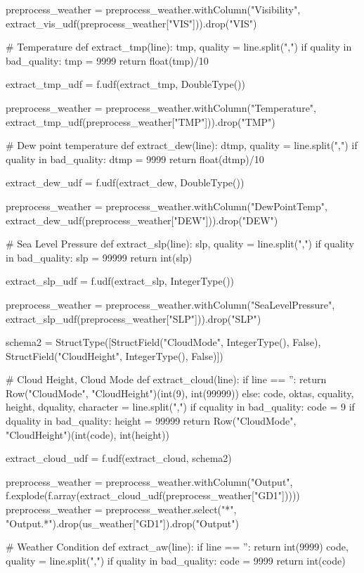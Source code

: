 \documentclass[11pt]{article}
\begin{document}
preprocess_weather = preprocess_weather.withColumn("Visibility", extract_vis_udf(preprocess_weather["VIS"])).drop("VIS")

# Temperature
def extract_tmp(line):
  tmp, quality = line.split(",")
  if quality in bad_quality:
      tmp = 9999
  return float(tmp)/10

extract_tmp_udf = f.udf(extract_tmp, DoubleType())

preprocess_weather = preprocess_weather.withColumn("Temperature", extract_tmp_udf(preprocess_weather["TMP"])).drop("TMP")

# Dew point temperature
def extract_dew(line):
  dtmp, quality = line.split(",")
  if quality in bad_quality:
      dtmp = 9999
  return float(dtmp)/10

extract_dew_udf = f.udf(extract_dew, DoubleType())

preprocess_weather = preprocess_weather.withColumn("DewPointTemp", extract_dew_udf(preprocess_weather["DEW"])).drop("DEW")

# Sea Level Pressure
def extract_slp(line):
  slp, quality = line.split(",")
  if quality in bad_quality:
      slp = 99999
  return int(slp)

extract_slp_udf = f.udf(extract_slp, IntegerType())

preprocess_weather = preprocess_weather.withColumn("SeaLevelPressure", extract_slp_udf(preprocess_weather["SLP"])).drop("SLP")

schema2 = StructType([StructField("CloudMode", IntegerType(), False), StructField("CloudHeight", IntegerType(), False)])

# Cloud Height, Cloud Mode
def extract_cloud(line):
    if line == '':
        return Row("CloudMode", "CloudHeight")(int(9), int(99999))
    else:
        code, oktas, cquality, height, dquality, character  = line.split(",")
        if cquality in bad_quality:
            code = 9
        if dquality in bad_quality:
            height = 99999
        return Row("CloudMode", "CloudHeight")(int(code), int(height))

extract_cloud_udf = f.udf(extract_cloud, schema2)

preprocess_weather = preprocess_weather.withColumn("Output", f.explode(f.array(extract_cloud_udf(preprocess_weather["GD1"]))))
preprocess_weather = preprocess_weather.select("*", "Output.*").drop(us_weather["GD1"]).drop("Output")

# Weather Condition
def extract_aw(line):
    if line == '':
        return int(9999)
    code, quality = line.split(",")
    if quality in bad_quality:
        code = 9999
    return int(code)
\end{document}
